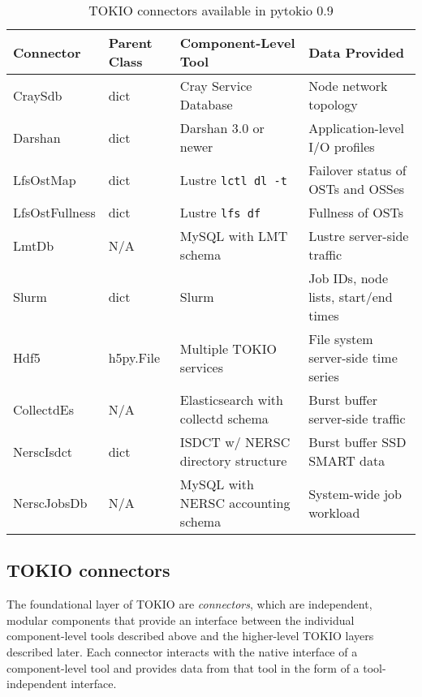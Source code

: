 \begin{table*}
\centering
\setlength{\extrarowheight}{0pt}
\addtolength{\extrarowheight}{\belowrulesep}
\setlength{\aboverulesep}{0pt}
\setlength{\belowrulesep}{0pt}
\caption{TOKIO connectors available in pytokio 0.9} \label{tab:connectors}
\begin{tabular}{llll} 
\toprule
\textbf{Connector} & \textbf{Parent Class} & \textbf{Component-Level Tool} & \textbf{Data Provided}               \\ 
\hline
CraySdb     & dict                   & Cray Service Database              & Node network topology                 \\ 
Darshan     & dict                   & Darshan 3.0 or newer               & Application-level I/O profiles        \\ 
LfsOstMap   & dict                   & Lustre \texttt{lctl dl -t}         & Failover status of OSTs and OSSes     \\ 
LfsOstFullness & dict                & Lustre \texttt{lfs df}             & Fullness of OSTs                      \\ 
LmtDb       & N/A                    & MySQL with LMT schema              & Lustre server-side traffic            \\ 
Slurm       & dict                   & Slurm                              & Job IDs, node lists, start/end times  \\ 
Hdf5        & h5py.File              & Multiple TOKIO services            & File system server-side time series   \\ 
\hdashline
CollectdEs  & N/A                    & Elasticsearch with collectd schema & Burst buffer server-side traffic      \\ 
NerscIsdct  & dict                   & ISDCT w/ NERSC directory structure & Burst buffer SSD SMART data           \\ 
NerscJobsDb & N/A                    & MySQL with NERSC accounting schema & System-wide job workload              \\
\bottomrule
\end{tabular}
\end{table*}

\subsection{TOKIO connectors} \label{sec:architecture/connectors}

The foundational layer of TOKIO are \emph{connectors}, which are independent, modular components that provide an interface between the individual component-level tools described above and the higher-level TOKIO layers described later.
Each connector interacts with the native interface of a component-level tool and provides data from that tool in the form of a tool-independent interface.

